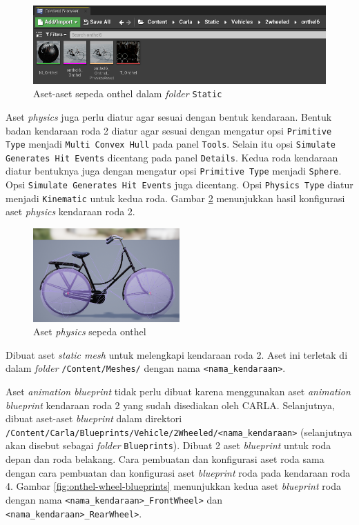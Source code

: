\begin{figure}[!h]
    \centering
    \includegraphics[width=1\textwidth]{resources/chapter-4/onthel-assets-in-static-folder.png}
    \caption{Aset-aset sepeda onthel dalam \textit{folder} \texttt{Static}}
    \label{fig:onthel-assets-in-static-folder}
\end{figure}

Aset \textit{physics} juga perlu diatur agar sesuai dengan bentuk kendaraan.
Bentuk badan kendaraan roda 2 diatur agar sesuai dengan mengatur opsi
\verb|Primitive Type| menjadi \verb|Multi Convex Hull| pada panel \verb|Tools|.
Selain itu opsi \verb|Simulate Generates Hit Events| dicentang pada panel
\verb|Details|. Kedua roda kendaraan diatur bentuknya juga dengan mengatur opsi
\verb|Primitive Type| menjadi \verb|Sphere|. Opsi \verb|Simulate Generates Hit Events|
juga dicentang. Opsi \verb|Physics Type| diatur menjadi \verb|Kinematic| untuk
kedua roda. Gambar \ref{fig:physics-asset-2wheeled} menunjukkan hasil
konfigurasi aset \textit{physics} kendaraan roda 2.

\begin{figure}[!h]
    \centering
    \includegraphics[width=0.5\textwidth]{resources/chapter-4/onthel-physics-asset.png}
    \caption{Aset \textit{physics} sepeda onthel}
    \label{fig:physics-asset-2wheeled}
\end{figure}

Dibuat aset \textit{static mesh} untuk melengkapi kendaraan roda 2. Aset ini
terletak di dalam \textit{folder} \verb|/Content/Meshes/| dengan nama
\verb|<nama_kendaraan>|.

Aset \textit{animation blueprint} tidak perlu dibuat karena menggunakan aset
\textit{animation blueprint} kendaraan roda 2 yang sudah disediakan oleh CARLA.
Selanjutnya, dibuat aset-aset \textit{blueprint} dalam direktori
\verb|/Content/Carla/Blueprints/Vehicle/2Wheeled/<nama_kendaraan>| (selanjutnya
akan disebut sebagai \textit{folder} \verb|Blueprints|). Dibuat 2 aset
\textit{blueprint} untuk roda depan dan roda belakang. Cara pembuatan dan
konfigurasi aset roda sama dengan cara pembuatan dan konfigurasi aset
\textit{blueprint} roda pada kendaraan roda 4. Gambar
\ref{fig:onthel-wheel-blueprints} menunjukkan kedua aset \textit{blueprint} roda
dengan nama \verb|<nama_kendaraan>_FrontWheel>| dan
\verb|<nama_kendaraan>_RearWheel>|.

